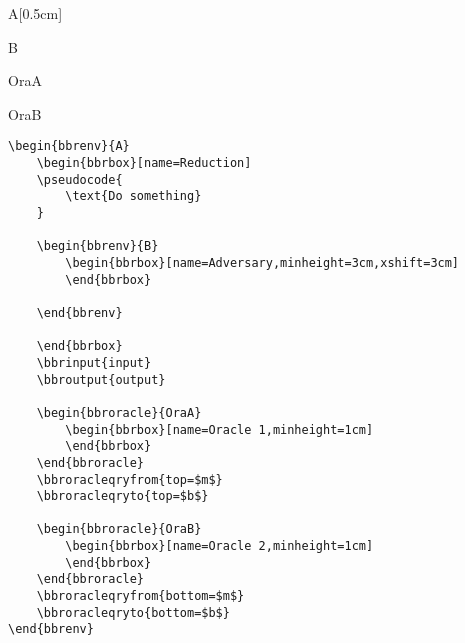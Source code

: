 \documentclass[a4paper]{report}
\begin{document}
\begin{bbrenv}[1cm]{A}[0.5cm]
	\begin{bbrbox}[name=Reduction]

	\begin{bbrenv}{B}
		\begin{bbrbox}[name=Adversary,minheight=3cm,xshift=3cm]
		\end{bbrbox}

	\end{bbrenv}

	\end{bbrbox}

	\begin{bbroracle}{OraA}
		\begin{bbrbox}[name=Oracle 1,minheight=1cm]
		\end{bbrbox}
	\end{bbroracle}

	\begin{bbroracle}{OraB}
		\begin{bbrbox}[name=Oracle 2,minheight=1cm]
		\end{bbrbox}
	\end{bbroracle}
\end{bbrenv}

\begin{lstlisting}
\begin{bbrenv}{A}
	\begin{bbrbox}[name=Reduction]
	\pseudocode{
		\text{Do something}
	}

	\begin{bbrenv}{B}
		\begin{bbrbox}[name=Adversary,minheight=3cm,xshift=3cm]
		\end{bbrbox}

	\end{bbrenv}

	\end{bbrbox}
	\bbrinput{input}
	\bbroutput{output}

	\begin{bbroracle}{OraA}
		\begin{bbrbox}[name=Oracle 1,minheight=1cm]
		\end{bbrbox}
	\end{bbroracle}
	\bbroracleqryfrom{top=$m$}
	\bbroracleqryto{top=$b$}

	\begin{bbroracle}{OraB}
		\begin{bbrbox}[name=Oracle 2,minheight=1cm]
		\end{bbrbox}
	\end{bbroracle}
	\bbroracleqryfrom{bottom=$m$}
	\bbroracleqryto{bottom=$b$}
\end{bbrenv}
\end{lstlisting}
\end{document}
